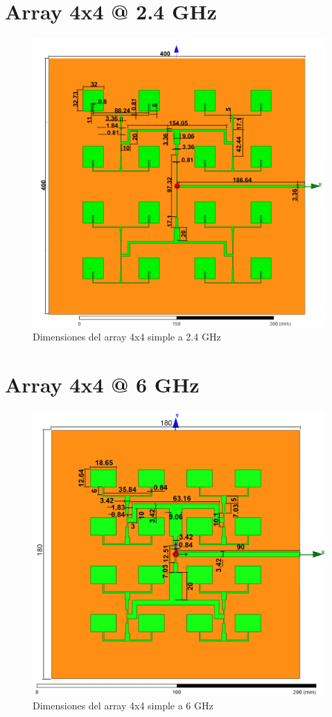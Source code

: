 \section{Array 4x4 @ 2.4 GHz}
\vfill
\begin{figure}[H]
   	 \centering
        \includegraphics[width=\textwidth ,height=\textheight, keepaspectratio=true]{archivos/desarrollo/autocad/10}
        \caption{Dimensiones del array 4x4 simple a 2.4 GHz}
        \label{fig:4x41}
\end{figure}
\vfill
\newpage


\section{Array 4x4 @ 6 GHz}
\vfill
\begin{figure}[H]
   	 \centering
        \includegraphics[width=\textwidth ,height=\textheight, keepaspectratio=true]{archivos/desarrollo/autocad/11}
        \caption{Dimensiones del array 4x4 simple a 6 GHz}
        \label{fig:4x42}
\end{figure}
\vfill
\newpage